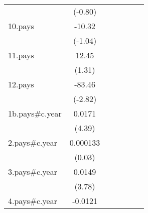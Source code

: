 {\begin{tabular}{l*{6}{c}}
                    &     (-0.80)         &                     &                     &                     &                     &                     \\
[1em]
10.pays             &      -10.32         &                     &                     &                     &                     &                     \\
                    &     (-1.04)         &                     &                     &                     &                     &                     \\
[1em]
11.pays             &       12.45         &                     &                     &                     &                     &                     \\
                    &      (1.31)         &                     &                     &                     &                     &                     \\
[1em]
12.pays             &      -83.46\sym{**} &                     &                     &                     &                     &                     \\
                    &     (-2.82)         &                     &                     &                     &                     &                     \\
[1em]
1b.pays#c.year      &      0.0171\sym{***}&                     &                     &                     &                     &                     \\
                    &      (4.39)         &                     &                     &                     &                     &                     \\
[1em]
2.pays#c.year       &    0.000133         &                     &                     &                     &                     &                     \\
                    &      (0.03)         &                     &                     &                     &                     &                     \\
[1em]
3.pays#c.year       &      0.0149\sym{***}&                     &                     &                     &                     &                     \\
                    &      (3.78)         &                     &                     &                     &                     &                     \\
[1em]
4.pays#c.year       &     -0.0121\sym{**} &                     &                     &                     &                     &                     \\

\end{tabular}}
